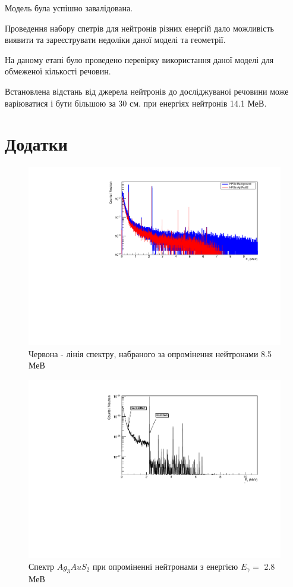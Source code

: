 \documentclass[a4paper, 14pt]{article}
\numberwithin{equation}{section}
\numberwithin{table}{section}
\begin{document}
Модель була успішно завалідована.

Проведення набору спетрів для нейтронів різних енергій дало можливість виявити та зареєструвати недоліки даної моделі та геометрії. 

На даному етапі було проведено перевірку використання даної моделі для обмеженої кількості речовин. 

Встановлена відстань від джерела нейтронів до досліджуваної речовини може варіюватися і бути більшою за 30 см. при енергіях нейтронів 14.1 МеВ.
	
	
\newpage 
\section{Додатки}
\setcounter{figure}{0}
\begin{figure}[h!]
	\centering \includegraphics[width=1\textwidth]{res/Ag3AuS2_8_5MeVFonClasic.pdf}
	\caption{Червона - лінія спектру, набраного за опромінення нейтронами 8.5 МеВ}
	\label{ris:Ag3AuS28_5MeV}	
\end{figure} 
\begin{figure}[h!]
	\centering \includegraphics[width=1\textwidth]{res/AuAgS28MeV.pdf}
	\caption{ Спектр $Ag_3AuS_2$ при опроміненні нейтронами з енергією $E_{\gamma} = $ 2.8 МеВ}
	\label{ris:Ag3AuS22_8MeV}	
\end{figure}
\end{document}

